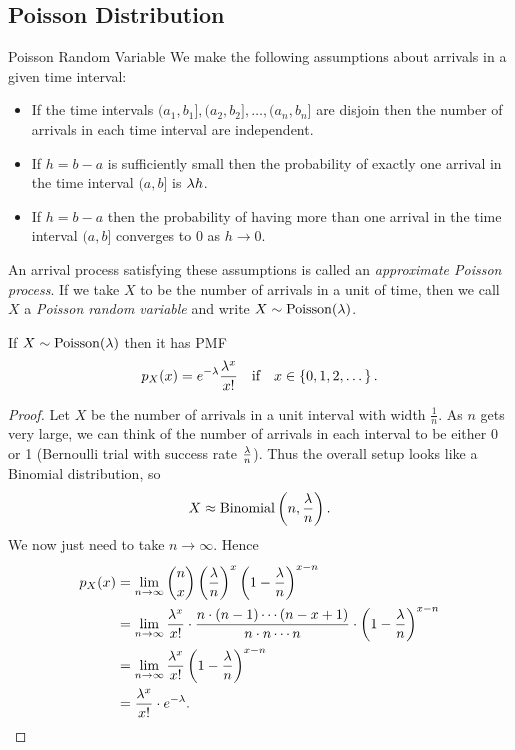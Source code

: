 \documentclass[class=article, crop=false]{standalone}
\begin{document}
  \subsection{Poisson Distribution}
  \begin{definition}{Poisson Random Variable}
    We make the following assumptions about arrivals in a given time interval:
    \begin{itemize}
      \item If the time intervals $(a_1, b_1], (a_2, b_2],\dotsc,(a_n, b_n]$ are disjoin then the number of arrivals in each time interval are independent.
      \item If $h = b - a$ is sufficiently small then the probability of exactly one arrival in the time interval $(a, b]$ is $\lambda h$.
      \item If $h = b - a$ then the probability of having more than one arrival in the time interval $(a, b]$ converges to 0 as $h\to 0$.
    \end{itemize}
    An arrival process satisfying these assumptions is called an \emph{approximate Poisson process}. If we take $X$ to be the number of arrivals in a unit of time, then we call $X$ a \emph{Poisson random variable} and write $X\sim \operatorname{Poisson}(\lambda)$.
  \end{definition}
  \begin{theorem}{}
    If $X\sim \operatorname{Poisson}(\lambda)$ then it has PMF
    \[
      p_X(x) = e^{-\lambda} \frac{\lambda^x}{x!}\quad\text{if}\quad x\in \left\{0,1,2,\dotsc\right\}.
    \]
    \begin{proof}
      Let $X$ be the number of arrivals in a unit interval with width $\frac{1}{n}$. As $n$ gets very large, we can think of the number of arrivals in each interval to be either 0 or 1 (Bernoulli trial with success rate $\frac{\lambda}{n}$). Thus the overall setup looks like a Binomial distribution, so
      \[
        X\approx \operatorname{Binomial}\left( n, \frac{\lambda}{n} \right).
      \]
      We now just need to take $n\to\infty$. Hence
      \begin{align*}
        p_X(x) &= \lim_{n\to \infty} \binom{n}{x}\left( \frac{\lambda}{n} \right)^x \left( 1 - \frac{\lambda}{n} \right)^{x - n} \\
               &= \lim_{n\to \infty} \frac{\lambda^x}{x!}\cdot \frac{n\cdot (n - 1)\dotsb(n - x + 1)}{n\cdot n\dotsb n}\cdot \left( 1 - \frac{\lambda}{n} \right)^{x - n} \\
               &= \lim_{n\to \infty} \frac{\lambda^x}{x!} \left( 1 - \frac{\lambda}{n} \right)^{x - n} \\
               &= \frac{\lambda^x}{x!}\cdot e^{-\lambda}.
      \end{align*}
    \end{proof}
  \end{theorem}
\end{document}
